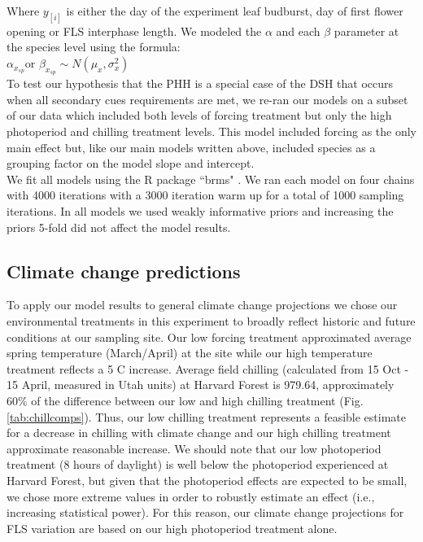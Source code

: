 \documentclass[11pt]{article}
\begin{document}
Where $y_{[i]}$ is either the day of the experiment leaf budburst, day of first flower opening or FLS interphase length.  We modeled the $\alpha$ and each $\beta$ parameter at the species level using the formula:\\

$\alpha_{x_{sp}} $or $\beta_{x_{sp}} \sim N(\mu_x,\sigma^2_x)$\\

\noindent To test our hypothesis that the PHH is a special case of the DSH that occurs when all secondary cues requirements are met, we re-ran our models on a subset of our data which included both levels of forcing treatment but only the high photoperiod and chilling treatment levels. This model included forcing as the only main effect but, like our main models written above, included species as a grouping factor on the model slope and intercept.\\ 

\noindent We fit all models using the R package ``brms" \citep{Burkner2018}. We ran each model on four chains with 4000 iterations with a 3000 iteration warm up for a total of 1000 sampling iterations. In all models we used weakly informative priors and increasing the priors 5-fold did not affect the model results.\\ %


\subsection*{Climate change predictions}
\noindent To apply our model results to general climate change projections we chose our environmental treatments in this experiment to broadly reflect historic and future conditions at our sampling site. Our low forcing treatment approximated average spring temperature (March/April) at the site while our high temperature treatment reflects a 5 \degree C increase. Average field chilling (calculated from 15 Oct - 15 April, measured in Utah units) at Harvard Forest is 979.64, approximately 60\% of the difference between our low and high chilling treatment (Fig. \ref{tab:chillcomps}). Thus, our low chilling treatment represents a feasible estimate for a decrease in chilling with climate change and our high chilling treatment approximate reasonable increase. We should note that our low photoperiod treatment (8 hours of daylight) is well below the photoperiod experienced at Harvard Forest, but given that the photoperiod effects are expected to be small, we chose more extreme values in order to robustly estimate an effect (i.e., increasing statistical power). For this reason, our climate change projections for FLS variation are based on our high photoperiod treatment alone.\\
\end{document}
